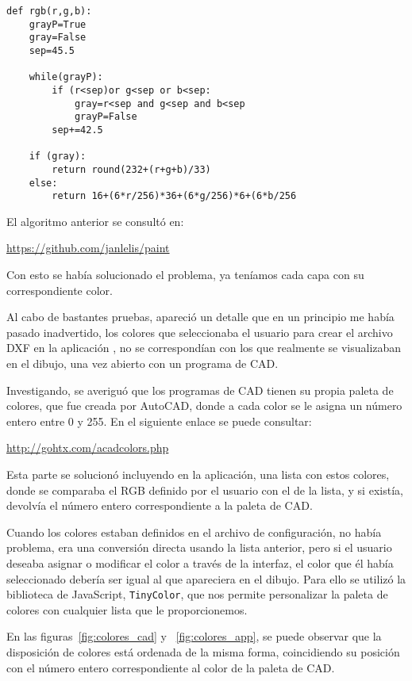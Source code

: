 \begin{lstlisting}
def rgb(r,g,b):
    grayP=True
    gray=False
    sep=45.5

    while(grayP):
        if (r<sep)or g<sep or b<sep:
            gray=r<sep and g<sep and b<sep
            grayP=False
        sep+=42.5

    if (gray):
        return round(232+(r+g+b)/33)
    else:
        return 16+(6*r/256)*36+(6*g/256)*6+(6*b/256
\end{lstlisting}

El algoritmo anterior se consultó en:

\url{https://github.com/janlelis/paint} 

Con esto se había solucionado el problema, ya teníamos cada capa con su correspondiente color.

Al cabo de bastantes pruebas, apareció un detalle que en un principio me había pasado inadvertido, los colores que seleccionaba el usuario para crear el archivo DXF en la aplicación , no se correspondían con los que realmente se visualizaban en el dibujo, una vez abierto con un programa de CAD.

Investigando, se averiguó que los programas de CAD tienen su propia paleta de colores, que fue creada por AutoCAD, donde a cada color se le asigna un número entero entre 0 y 255. En el siguiente enlace se puede consultar:


\url{http://gohtx.com/acadcolors.php}

Esta parte se solucionó incluyendo en la aplicación, una lista con estos colores, donde se comparaba el RGB definido por el usuario con el de la lista, y si existía, devolvía el número entero correspondiente a la paleta de CAD.

Cuando los colores estaban definidos en el archivo de configuración, no había problema, era una conversión directa usando la lista anterior, pero si el usuario deseaba asignar o modificar el color a través de la interfaz, el color que él había seleccionado debería ser igual al que apareciera en el dibujo. Para ello se utilizó la biblioteca de JavaScript, \texttt{TinyColor}, que nos permite personalizar la paleta de colores con cualquier lista que le proporcionemos.



En las figuras~\ref{fig:colores_cad} y ~\ref{fig:colores_app}, se puede observar que la disposición de colores está ordenada de la misma forma, coincidiendo su posición con el número entero correspondiente al color de la paleta de CAD.

